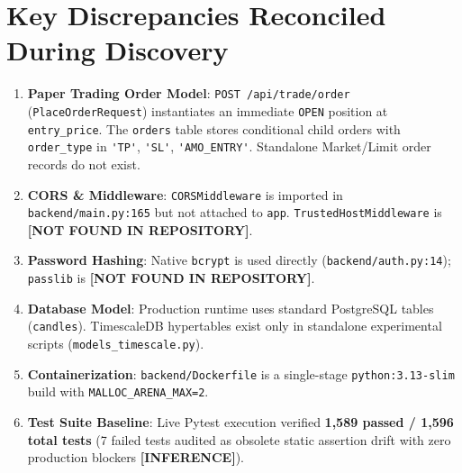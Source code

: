 \documentclass[11pt,a4paper,oneside,openany]{report}
\newcommand{\code}[1]{\nolinkurl{#1}}
\def\tag#1{\textsc{\textbf{[#1]}}}
\def\tag#1{\textsc{\textbf{[#1]}}}
\begin{document}
\section*{Key Discrepancies Reconciled During Discovery}
\begin{enumerate}[leftmargin=5mm,itemsep=0.8mm]
    \item \textbf{Paper Trading Order Model}: \code{POST /api/trade/order} (\code{PlaceOrderRequest}) instantiates an immediate \code{OPEN} position at \code{entry_price}. The \code{orders} table stores conditional child orders with \code{order_type} in \code{'TP'}, \code{'SL'}, \code{'AMO_ENTRY'}. Standalone Market/Limit order records do not exist.
    \item \textbf{CORS \& Middleware}: \code{CORSMiddleware} is imported in \code{backend/main.py:165} but not attached to \code{app}. \code{TrustedHostMiddleware} is \tag{NOT FOUND IN REPOSITORY}.
    \item \textbf{Password Hashing}: Native \code{bcrypt} is used directly (\code{backend/auth.py:14}); \code{passlib} is \tag{NOT FOUND IN REPOSITORY}.
    \item \textbf{Database Model}: Production runtime uses standard PostgreSQL tables (\code{candles}). TimescaleDB hypertables exist only in standalone experimental scripts (\code{models_timescale.py}).
    \item \textbf{Containerization}: \code{backend/Dockerfile} is a single-stage \code{python:3.13-slim} build with \code{MALLOC_ARENA_MAX=2}.
    \item \textbf{Test Suite Baseline}: Live Pytest execution verified \textbf{1,589 passed / 1,596 total tests} (7 failed tests audited as obsolete static assertion drift with zero production blockers \tag{INFERENCE}).
\end{enumerate}

\newpage
\tableofcontents

\newpage
\listoffigures

\newpage
\listoftables

\newpage
{}
























\end{document}

